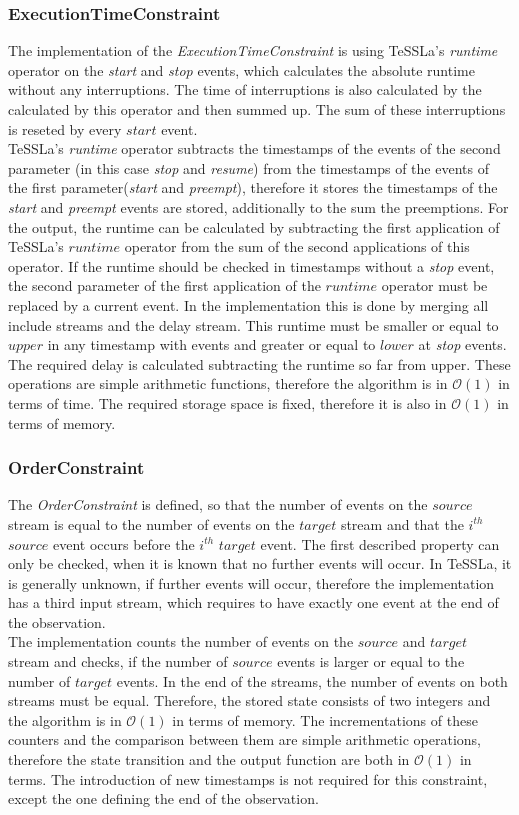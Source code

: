 \subsubsection{ExecutionTimeConstraint}
	The implementation of the \emph{ExecutionTimeConstraint} is using TeSSLa's \emph{runtime} operator on the \emph{start} and \emph{stop} events, which calculates the absolute runtime without any interruptions. The time of interruptions is also calculated by the calculated by this operator and then summed up. The sum of these interruptions is reseted by every $start$ event.\\
	TeSSLa's \emph{runtime} operator subtracts the timestamps of the events of the second parameter (in this case \emph{stop} and \emph{resume}) from the timestamps of the events of the first parameter(\emph{start} and \emph{preempt}), therefore it stores the timestamps of the \emph{start} and \emph{preempt} events are stored, additionally to the sum the preemptions.
	For the output, the runtime can be calculated by subtracting the first application of TeSSLa's $runtime$ operator from the sum of the second applications of this operator. If the runtime should be checked in timestamps without a \emph{stop} event, the second parameter of the first application of the $runtime$ operator must be replaced by a current event. In the implementation this is done by merging all include streams and the delay stream. This runtime must be smaller or equal to $upper$ in any timestamp with events and greater or equal to $lower$ at \emph{stop} events. The required delay is calculated subtracting the runtime so far from upper. These operations are simple arithmetic functions, therefore the algorithm is in $\mathcal{O}(1)$ in terms of time. The required storage space is fixed, therefore it is also in $\mathcal{O}(1)$ in terms of memory.

\subsubsection{OrderConstraint}
	The \emph{OrderConstraint} is defined, so that the number of events on the $source$ stream is equal to the number of events on the $target$ stream and that the $i^{th}$ $source$ event occurs before the  $i^{th}$ $target$ event. The first described property can only be checked, when it is known that no further events will occur. In TeSSLa, it is generally unknown, if further events will occur, therefore the implementation has a third input stream, which requires to have exactly one event at the end of the observation.\\
	The implementation counts the number of events on the $source$ and $target$ stream and checks, if the number of $source$ events is larger or equal to the number of $target$ events. In the end of the streams, the number of events on both streams must be equal. Therefore, the stored state consists of two integers and the algorithm is in $\mathcal{O}(1)$ in terms of memory. The incrementations of these counters and the comparison between them are simple arithmetic operations, therefore the state transition and the output function are both in $\mathcal{O}(1)$ in terms. The introduction of new timestamps is not required for this constraint, except the one defining the end of the observation.
	
